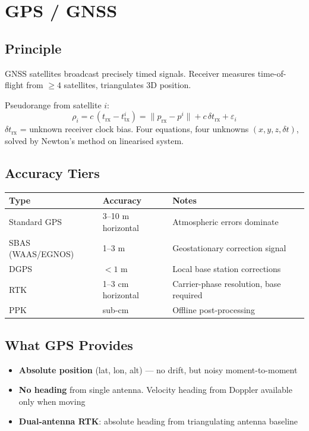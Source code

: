 \documentclass[11pt,a4paper]{article}
\begin{document}
\section{GPS / GNSS}

\subsection{Principle}

GNSS satellites broadcast precisely timed signals. Receiver measures time-of-flight from $\geq 4$ satellites, triangulates 3D position.

Pseudorange from satellite $i$:
\[
\rho_i = c\,(t_{\text{rx}} - t_{\text{tx}}^i) = \|p_{\text{rx}} - p^i\| + c\,\delta t_{\text{rx}} + \varepsilon_i
\]
$\delta t_{\text{rx}}$ = unknown receiver clock bias. Four equations, four unknowns $(x, y, z, \delta t)$, solved by Newton's method on linearised system.

\subsection{Accuracy Tiers}

\begin{center}
\begin{tabular}{lll}
\toprule
\textbf{Type} & \textbf{Accuracy} & \textbf{Notes} \\
\midrule
Standard GPS & 3--10 m horizontal & Atmospheric errors dominate \\
SBAS (WAAS/EGNOS) & 1--3 m & Geostationary correction signal \\
DGPS & $<1$ m & Local base station corrections \\
RTK & 1--3 cm horizontal & Carrier-phase resolution, base required \\
PPK & sub-cm & Offline post-processing \\
\bottomrule
\end{tabular}
\end{center}

\subsection{What GPS Provides}

\begin{itemize}
\item \textbf{Absolute position} (lat, lon, alt) --- no drift, but noisy moment-to-moment
\item \textbf{No heading} from single antenna. Velocity heading from Doppler available only when moving
\item \textbf{Dual-antenna RTK}: absolute heading from triangulating antenna baseline
\end{itemize}
\end{document}
